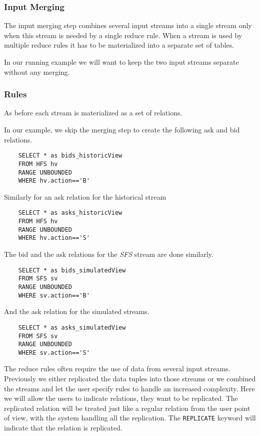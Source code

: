\documentclass{article}
\begin{document}
\subsubsection{Input Merging}

The input merging step combines several input streams into a single stream only when this stream is needed by a single reduce rule. When a stream is used by multiple reduce rules it has to be materialized into a separate set of tables. 

In our running example we will want to keep the two input streams separate without any merging. 

\subsubsection{Rules}

As before each stream is materialized as a set of relations. 

In our example, we skip the merging step to create the following ask and bid relations.

\begin{verbatim}  
    SELECT * as bids_historicView
    FROM HFS hv
    RANGE UNBOUNDED
    WHERE hv.action=='B'
\end{verbatim}

\noindent Similarly for an ask relation for the historical stream

\begin{verbatim}  
    SELECT * as asks_historicView
    FROM HFS hv
    RANGE UNBOUNDED
    WHERE hv.action=='S'
\end{verbatim}

\noindent The bid and the ask relations for the \emph{SFS} stream are done similarly.

\begin{verbatim}  
    SELECT * as bids_simulatedView
    FROM SFS sv
    RANGE UNBOUNDED
    WHERE sv.action=='B'
\end{verbatim}

\noindent And the ask relation for the simulated streams.

\begin{verbatim}  
    SELECT * as asks_simulatedView
    FROM SFS sv
    RANGE UNBOUNDED
    WHERE sv.action=='S'
\end{verbatim}


The reduce rules often require the use of data from several input streams. Previously we either replicated the data tuples into those streams or we combined the streams and let the user specify rules to handle an increased complexity. Here we will allow the users to indicate relations, they want to be replicated. The replicated relation will be treated just like a regular relation from the user point of view, with the system handling all the replication. The {\tt REPLICATE} keyword will indicate that the relation is replicated. 
\end{document}
